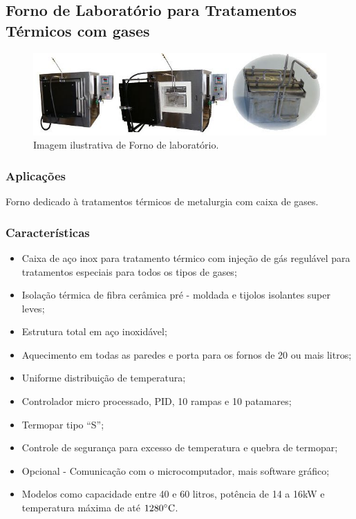 \subsection{Forno de Laboratório para Tratamentos Térmicos com gases}

\begin{figure}[!h]
	\centering
	\label{forno_gases}
	\includegraphics[keepaspectratio=true,scale=0.8]{figuras/forno_gases.JPG}
	\caption{Imagem ilustrativa de Forno de laboratório.}
\end{figure}

\subsubsection{Aplicações}

Forno dedicado à tratamentos térmicos de metalurgia com caixa de gases.

\subsubsection{Características}

\begin{itemize}
	\item Caixa de aço inox para tratamento térmico com injeção de gás regulável para tratamentos especiais para todos os tipos de gases;
	\item Isolação térmica de fibra cerâmica pré - moldada e tijolos isolantes super leves;
	\item Estrutura total em aço inoxidável;
	\item Aquecimento em todas as paredes e porta para os fornos de 20 ou mais litros;
	\item Uniforme distribuição de temperatura;
	\item Controlador micro processado, PID, 10 rampas e 10 patamares;
	\item Termopar tipo “S”;
	\item Controle de segurança para excesso de temperatura e quebra de termopar;
	\item Opcional - Comunicação com o microcomputador, mais software gráfico;
	\item Modelos como capacidade entre 40 e 60 litros, potência de 14 a 16kW e temperatura máxima de até $1280 \degree \text{C}$.
\end{itemize}

